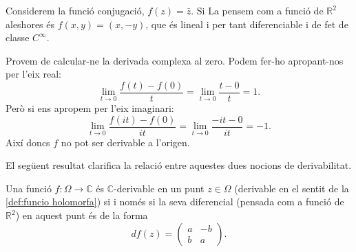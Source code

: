 \documentclass[12pt,twoside]{report}
\numberwithin{table}{section}
\numberwithin{equation}{section}
\numberwithin{figure}{section}
\newcommand{\R}{\ensuremath{\mathbb{R}}}
\newcommand{\C}{\ensuremath{\mathbb{C}}}
\begin{document}
\begin{exe}
	Considerem la funció conjugació, \( f(z) = \bar{z} \). Si La pensem com a funció de \( \R^2 \) aleshores és \( f(x,y) = (x, -y) \), que és lineal i per tant diferenciable i de fet de classe \( C^{\infty} \).
	
	Provem de calcular-ne la derivada complexa al zero. Podem fer-ho apropant-nos per l'eix real:
	\begin{equation*}
		\lim_{t \to 0}{\frac{f(t) - f(0)}{t}} = \lim_{t \to 0}{\frac{t - 0}{t}} = 1.
	\end{equation*}
	Però si ens apropem per l'eix imaginari:
	\begin{equation*}
		\lim_{t \to 0}{\frac{f(it) - f(0)}{it}} = \lim_{t \to 0}{\frac{-it - 0}{it}} = -1.
	\end{equation*}
	Així doncs \( f \) no pot ser derivable a l'origen.
\end{exe}

El següent resultat clarifica la relació entre aquestes dues nocions de derivabilitat.
\begin{prop}
	Una funció \( f \colon \Omega \to \C \) és \( \C \)-derivable en un punt \( z \in \Omega \) (derivable en el sentit de la \cref{def:funcio holomorfa}) si i només si la seva diferencial (pensada com a funció de \( \R^2 \)) en aquest punt és de la forma 
	\begin{equation*}
		df(z) = \begin{pmatrix}
			a & -b \\
			b & a
		\end{pmatrix}.
	\end{equation*}
\end{prop}
\end{document}

